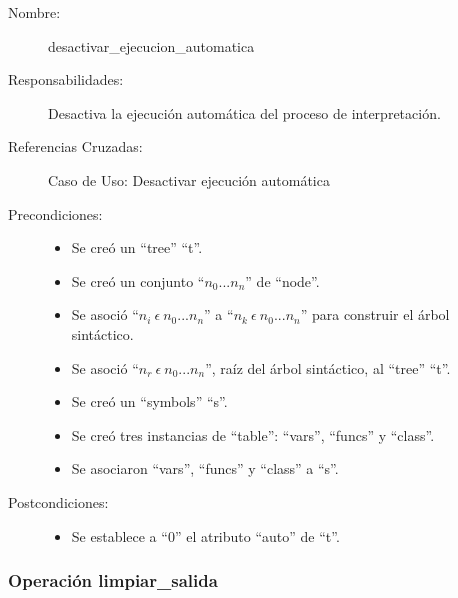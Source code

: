 	\begin{description}
		\item [Nombre:] desactivar\_ejecucion\_automatica
		\item [Responsabilidades:] Desactiva la ejecución automática del proceso de interpretación.
		\item [Referencias Cruzadas: ] Caso de Uso: Desactivar ejecución automática
      \item [Precondiciones:] \hfill
         \begin {itemize}
         \item Se creó un ``tree'' ``t''.
         \item Se creó un conjunto ``$n_0...n_n$'' de ``node''.
         \item Se asoció ``$n_i\ \epsilon\ n_0...n_n$'' a ``$n_k\ \epsilon\ n_0...n_n$'' para construir el árbol sintáctico.
         \item Se asoció  ``$n_r\ \epsilon\ n_0...n_n$'', raíz del árbol sintáctico, al ``tree'' ``t''.
         \item Se creó un ``symbols'' ``s''.
         \item Se creó tres instancias de ``table'': ``vars'', ``funcs'' y ``class''.
         \item Se asociaron ``vars'', ``funcs'' y ``class'' a ``s''.
      \end{itemize}
      \item [Postcondiciones:] \hfill
      \begin {itemize}
         \item Se establece a ``0'' el atributo ``auto'' de ``t''.
      \end{itemize}
	\end{description} 


\subsubsection{Operación limpiar\_salida}

